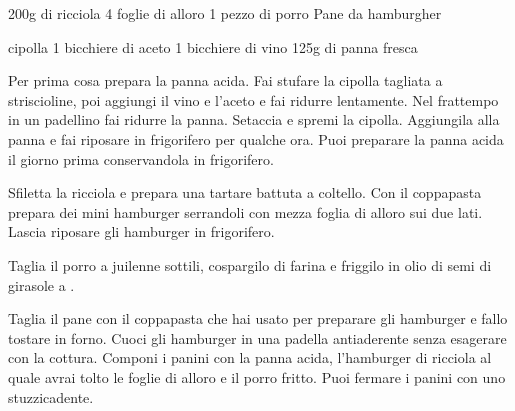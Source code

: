 \begin{ingreds}
	200g di ricciola
	4 foglie di alloro
	1 pezzo di porro
	Pane da hamburgher
	
\columnbreak
{} cipolla
	1 bicchiere di aceto
	1 bicchiere di vino
	125g di panna fresca
\end{ingreds}

\begin{method}
Per prima cosa prepara la panna acida. Fai stufare la cipolla tagliata a striscioline, poi aggiungi il vino e l'aceto e fai ridurre lentamente. Nel frattempo in un padellino fai ridurre la panna. Setaccia e spremi la cipolla. Aggiungila alla panna e fai riposare in frigorifero per qualche ora. Puoi preparare la panna acida il giorno prima conservandola in frigorifero.

Sfiletta la ricciola e prepara una tartare battuta a coltello. Con il coppapasta prepara dei mini hamburger serrandoli con mezza foglia di alloro sui due lati. Lascia riposare gli hamburger in frigorifero.

Taglia il porro a juilenne sottili, cospargilo di farina e friggilo in olio di semi di girasole a .

Taglia il pane con il coppapasta che hai usato per preparare gli hamburger e fallo tostare in forno. Cuoci gli hamburger in una padella antiaderente senza esagerare con la cottura. Componi i panini con la panna acida, l'hamburger di ricciola al quale avrai tolto le foglie di alloro e il porro fritto. Puoi fermare i panini con uno stuzzicadente.
\end {method}

